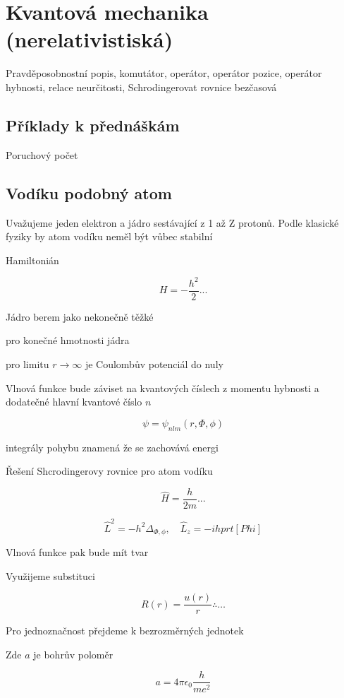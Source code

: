 \chapter{Kvantová mechanika (nerelativistiská)}

Pravděposobnostní popis, komutátor, operátor, operátor pozice, operátor hybnosti,  relace neurčitosti, Schrodingerovat rovnice bezčasová 

\section{Příklady k přednáškám }

Poruchový počet


\section{Vodíku podobný atom}
\label{QM.30.01.2021}

Uvažujeme jeden elektron a jádro sestávající z 1 až Z protonů.
Podle klasické fyziky by atom vodíku neměl být vůbec stabilní

Hamiltonián

$$
    H = -\frac{h^2}{2} ...
$$

Jádro berem jako nekonečně těžké


pro konečné hmotnosti jádra


pro limitu $r \to \infty$ je Coulombův potenciál do nuly


Vlnová funkce bude záviset na kvantových číslech z momentu hybnosti
a dodatečné hlavní kvantové číslo $n$


$$
    \psi = \psi_{nlm}(r, \Phi, \phi)
$$


integrály pohybu znamená že se zachovává energi


Řešení Shcrodingerovy rovnice pro atom vodíku

$$

    \hat{H} = \frac{h}{2m} ...
$$


$$
    \hat{L}^2 = -h^2\Delta_{\Phi, \phi}, \quad \hat{L}_z = -ih prt[Phi]
$$


Vlnová funkce pak bude mít tvar


Využijeme substituci

$$
	R(r) = \frac{u(r)}{r} \therefore \ldots
$$

Pro jednoznačnost přejdeme k bezrozměrných jednotek

Zde $a$ je bohrův poloměr

$$
    a = 4\pi\epsilon_0 \frac{h}{me^2}
$$

